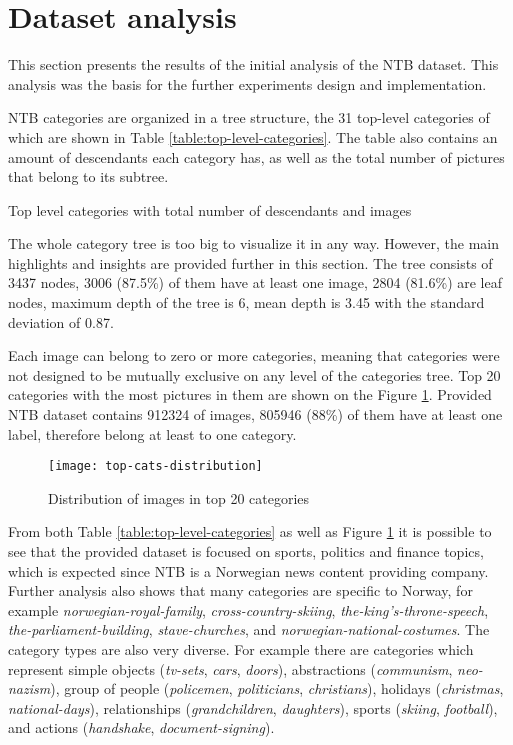 \section{Dataset analysis}
\label{sec:dataset-analysis}
This section presents the results of the initial analysis of the NTB dataset. This analysis was the basis for the further experiments design and implementation.

NTB categories are organized in a tree structure, the 31 top-level categories of which are shown in Table \ref{table:top-level-categories}. The table also contains an amount of descendants each category has, as well as the total number of pictures that belong to its subtree.

\begin{table}[H]
    \centering
    \small
    \caption{Top level categories with total number of descendants and images}
    \label{table:top-level-categories}
\end{table}

The whole category tree is too big to visualize it in any way. However, the main highlights and insights are provided further in this section. The tree consists of 3437 nodes, 3006 (87.5\%) of them have at least one image, 2804 (81.6\%) are leaf nodes, maximum depth of the tree is 6, mean depth is 3.45 with the standard deviation of 0.87. 

Each image can belong to zero or more categories, meaning that categories were not designed to be mutually exclusive on any level of the categories tree. Top 20 categories with the most pictures in them are shown on the Figure \ref{fig:top-cats-distribution}.  Provided NTB dataset contains 912324 of images, 805946 (88\%) of them have at least one label, therefore belong at least to one category.

\begin{figure}[H]
    \centering
    \texttt{[image: top-cats-distribution]}
    \caption{Distribution of images in top 20 categories}
    \label{fig:top-cats-distribution}
\end{figure}

From both Table \ref{table:top-level-categories} as well as Figure \ref{fig:top-cats-distribution} it is possible to see that the provided dataset is focused on sports, politics and finance topics, which is expected since NTB is a Norwegian news content providing company. Further analysis also shows that many categories are specific to Norway, for example \textit{norwegian-royal-family}, \textit{cross-country-skiing}, \textit{the-king's-throne-speech}, \textit{the-parliament-building}, \textit{stave-churches}, and \textit{norwegian-national-costumes}. The category types are also very diverse. For example there are categories which represent simple objects (\textit{tv-sets}, \textit{cars}, \textit{doors}), abstractions (\textit{communism}, \textit{neo-nazism}), group of people (\textit{policemen}, \textit{politicians}, \textit{christians}), holidays (\textit{christmas}, \textit{national-days}), relationships (\textit{grandchildren}, \textit{daughters}), sports (\textit{skiing}, \textit{football}), and actions (\textit{handshake}, \textit{document-signing}).

